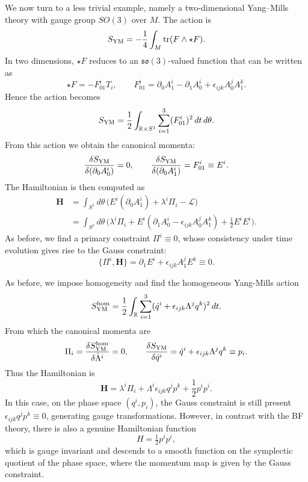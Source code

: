 \documentclass{article}
\numberwithin{equation}{section}
\theoremstyle{definition}
\begin{document}
We now turn to a less trivial example, namely a two-dimensional Yang--Mills theory with gauge group $SO(3)$ over $M$. The action is
\begin{equation}
    S_{\rm YM}=-\frac{1}{4}\int_M \mathrm{tr}(F\wedge \star F).
\end{equation}
In two dimensions, $\star F$ reduces to an $\mathfrak{so}(3)$-valued function that can be written as
\[
\star F=-F_{01}^iT_i, 
\qquad 
F_{01}^i=\partial_0A_1^i-\partial_1A_0^i+\epsilon_{ijk}A^j_0A^k_1.
\]
Hence the action becomes
\begin{equation}
    S_{\rm YM}=\frac{1}{2}\int_{\mathbb{R}\times S^1}\sum_{i=1}^3 (F^i_{01})^2\,dt\,d\theta.
\end{equation}
From this action we obtain the canonical momenta:
\begin{equation}
    \frac{\delta S_{\rm YM}}{\delta(\partial_0A_0^i)}=0,
\qquad
\frac{\delta S_{\rm YM}}{\delta(\partial_0A_1^i)}=F^i_{01}\equiv E^i.
\end{equation}
The Hamiltonian is then computed as
\begin{equation}
    \begin{split}
        \mathbf{H}&=\int_{S^1} d\theta \,\bigl(E^i(\partial_0A_1^i)+\lambda^i\Pi_i-\mathcal{L}\bigr) \\
&=\int_{S^1} d\theta \,\bigl(\lambda^i\Pi_i+E^i(\partial_1A_0^i-\epsilon_{ijk}A^j_0A^k_1)+\tfrac{1}{2}E^iE^i\bigr).
    \end{split}
\end{equation}
As before, we find a primary constraint $\Pi^i\equiv 0$, whose consistency under time evolution gives rise to the Gauss constraint:
\begin{equation}
    \{\Pi^i,\mathbf{H}\}=\partial_1E^i+\epsilon_{ijk}A^j_1E^k \equiv 0.
\end{equation}

\smallskip

As before, we impose homogeneity and find the homogeneous Yang-Mills action
\begin{equation}
    S_{\rm YM}^{\rm hom}=\frac{1}{2}\int_{\mathbb{R}}\sum_{i=1}^3 (\dot q^i+\epsilon_{ijk}\Lambda^jq^k)^2\,dt.
\end{equation}
From which the canonical momenta are
\begin{equation}
    \Pi_i=\frac{\delta S_{\rm YM}^{\rm hom}}{\delta\dot\Lambda^i}=0,
\qquad
\frac{\delta S_{\rm YM}}{\delta\dot q^i}=\dot q^i+\epsilon_{ijk}\Lambda^jq^k\equiv p_i.
\end{equation}
Thus the Hamiltonian is
\begin{equation}
    \mathbf{H}=\lambda^i\Pi_i+\Lambda^i\epsilon_{ijk}q^jp^k+\frac{1}{2}p^ip^i.
\end{equation}
In this case, on the phase space $(q^i,p_i)$, the Gauss constraint is still present $\epsilon_{ijk}q^jp^k\equiv0$, generating gauge transformations. However, in contrast with the BF theory, there is also a genuine Hamiltonian function
\[
H=\tfrac{1}{2}p^ip^i,
\]
which is gauge invariant and descends to a smooth function on the symplectic quotient of the phase space, where the momentum map is given by the Gauss constraint.



\end{document}
